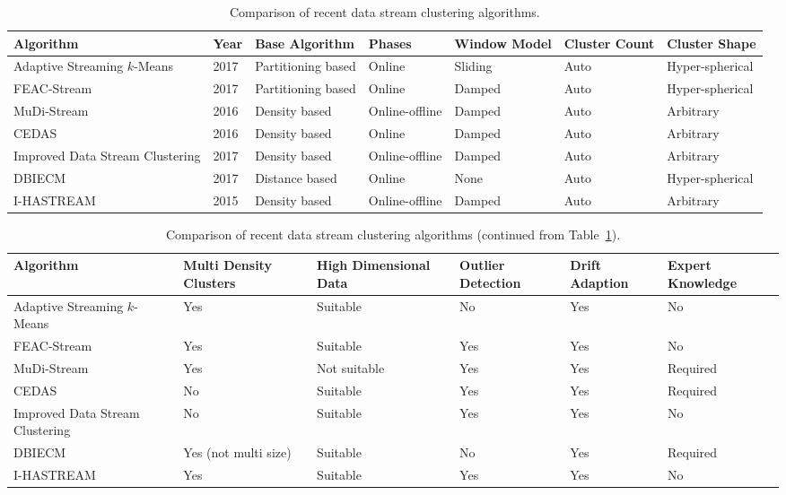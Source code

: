 \documentclass[smallcondensed]{svjour3}     %
\begin{document}
\begin{table}[t]
	\centering
	\caption{Comparison of recent data stream clustering algorithms.}
	\begin{tabular}{p{2cm} p{0.7cm} p{1.3cm} p{1cm} p{1.2cm} p{0.8cm} p{1.2cm}}
		\textbf{Algorithm} & \textbf{Year} & \textbf{Base Algorithm} & \textbf{Phases} & \textbf{Window Model} & \textbf{Cluster Count} & \textbf{Cluster Shape} \\
		\hline
		Adaptive Streaming $k$-Means & 2017 & Partitioning based & Online & Sliding & Auto & Hyper-spherical  \\
		\hline
		FEAC-Stream & 2017 & Partitioning based & Online & Damped & Auto & Hyper-spherical\\
		\hline
		MuDi-Stream & 2016 & Density based & Online-offline & Damped & Auto & Arbitrary \\
		\hline
		CEDAS & 2016 & Density based & Online & Damped & Auto & Arbitrary \\
		\hline
		Improved Data Stream Clustering & 2017 & Density based & Online-offline & Damped & Auto & Arbitrary \\
		\hline
		DBIECM & 2017 & Distance based & Online & None & Auto & Hyper-spherical \\
		\hline
		I-HASTREAM & 2015 & Density based & Online-offline & Damped & Auto & Arbitrary \\
		\hline
	\end{tabular}

	\label{tbl:comparison}
\end{table}

\begin{table}[t]
	\centering
	\caption{Comparison of recent data stream clustering algorithms (continued from Table~\ref{tbl:comparison}).}
	\begin{tabular}{p{2cm} p{1.25cm} p{2cm} p{1.5cm} p{1.5cm} p{1.5cm}}
		\textbf{Algorithm} & \textbf{Multi Density Clusters} & \textbf{High Dimensional Data} & \textbf{Outlier Detection} & \textbf{Drift Adaption} & \textbf{Expert Knowledge} \\
		\hline
		Adaptive Streaming $k$-Means & Yes & Suitable & No & Yes & No  \\
		\hline
		FEAC-Stream & Yes & Suitable & Yes & Yes & No \\
		\hline
		MuDi-Stream & Yes & Not suitable & Yes & Yes & Required\\
		\hline
		CEDAS & No & Suitable & Yes & Yes & Required \\
		\hline
		Improved Data Stream Clustering & No & Suitable & Yes & Yes & No \\
		\hline
		DBIECM & Yes (not multi size) & Suitable & No & Yes & Required \\
		\hline
		I-HASTREAM & Yes & Suitable & Yes & Yes & No \\
		\hline
	\end{tabular}
	\label{tbl:comparison2}
\end{table}
\end{document}
